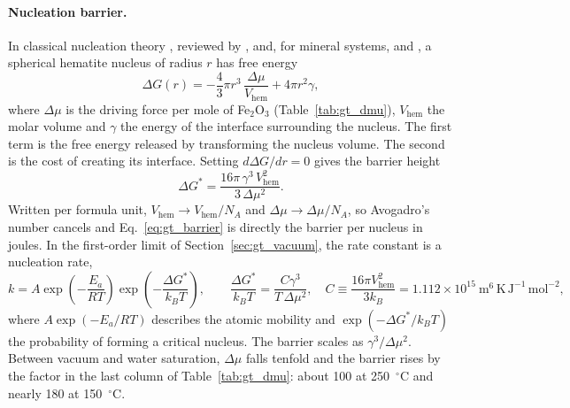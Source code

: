 \paragraph{Nucleation barrier.} In classical nucleation theory \citep{gibbs1878,volmer1926,becker1935},
reviewed by \citet{christian2002}, \citet{kashchiev2000} and, for mineral systems,
\citet{deyoreo2003} and \citet{lasaga1998}, a spherical hematite nucleus of radius $r$ has free
energy
\begin{equation}
  \Delta G(r) = -\frac{4}{3}\pi r^{3}\,\frac{\Delta\mu}{V_{\mathrm{hem}}} + 4\pi r^{2}\gamma,
\end{equation}
where $\Delta\mu$ is the driving force per mole of Fe$_2$O$_3$ (Table~\ref{tab:gt_dmu}),
$V_{\mathrm{hem}}$ the molar volume and $\gamma$ the energy of the interface surrounding the
nucleus. The first term is the free energy released by transforming the nucleus volume. The second
is the cost of creating its interface. Setting $d\Delta G/dr=0$ gives the barrier height
\begin{equation}
  \Delta G^{*} = \frac{16\pi\,\gamma^{3}\,V_{\mathrm{hem}}^{2}}{3\,\Delta\mu^{2}} .
  \label{eq:gt_barrier}
\end{equation}
Written per formula unit, $V_{\mathrm{hem}}\to V_{\mathrm{hem}}/N_A$ and $\Delta\mu\to\Delta\mu/N_A$, so
Avogadro's number cancels and Eq.~\ref{eq:gt_barrier} is directly the barrier per nucleus in
joules. In the first-order limit of Section~\ref{sec:gt_vacuum}, the rate constant is a nucleation
rate,
\begin{equation}
  k = A\exp\!\left(-\frac{E_a}{RT}\right)\exp\!\left(-\frac{\Delta G^{*}}{k_B T}\right),
  \qquad
  \frac{\Delta G^{*}}{k_B T} = \frac{C\gamma^{3}}{T\,\Delta\mu^{2}},
  \quad
  C \equiv \frac{16\pi V_{\mathrm{hem}}^{2}}{3k_B} = 1.112\times10^{15}~\mathrm{m^6\,K\,J^{-1}\,mol^{-2}} ,
  \label{eq:gt_knuc}
\end{equation}
where $A\exp(-E_a/RT)$ describes the atomic mobility and $\exp(-\Delta G^{*}/k_BT)$ the probability of
forming a critical nucleus. The barrier scales as $\gamma^3/\Delta\mu^2$. Between vacuum and water
saturation, $\Delta\mu$ falls tenfold and the barrier rises by the factor in the last column of
Table~\ref{tab:gt_dmu}: about 100 at 250~$^\circ$C and nearly 180 at 150~$^\circ$C.

